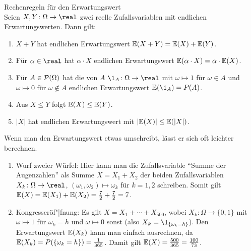 \linie

\begin{Satz}{Rechenregeln für den Erwartungswert}\\
    Seien $X, Y\colon \Omega \rightarrow \real$ zwei reelle Zufallsvariablen mit endlichen
    Erwartungswerten.
    Dann gilt:
    \begin{enumerate}
        \item
        $X + Y$ hat endlichen Erwartungswert $\EW(X + Y) = \EW(X) + \EW(Y)$.
        
        \item
        Für $\alpha \in \real$ hat
        $\alpha \cdot X$ endlichen Erwartungswert $\EW(\alpha \cdot X) = \alpha \cdot \EW(X)$.
        
        \item
        Für $A \in \P(\Omega)$ hat die  von $A$
        $\1_A\colon \Omega \rightarrow \real$ mit $\omega \mapsto 1$ für $\omega \in A$ und
        $\omega \mapsto 0$ für $\omega \notin A$ endlichen Erwartungswert $\EW(\1_A) = P(A)$.
        
        \item
        Aus $X \le Y$ folgt $\EW(X) \le \EW(Y)$.
        
        \item
        $|X|$ hat endlichen Erwartungswert mit $|\EW(X)| \le \EW(|X|)$.
    \end{enumerate}
\end{Satz}

\begin{Bsp}
    Wenn man den Erwartungswert etwas umschreibt, lässt er sich oft leichter berechnen.
    \begin{enumerate}
        \item
        Wurf zweier Würfel:
        Hier kann man die Zufallsvariable "`Summe der Augenzahlen"' als Summe $X = X_1 + X_2$
        der beiden Zufallsvariablen $X_k\colon \Omega \rightarrow \real$,
        $(\omega_1, \omega_2) \mapsto \omega_k$ für $k = 1, 2$ schreiben.
        Somit gilt $\EW(X) = \EW(X_1) + \EW(X_2) = \frac{7}{2} + \frac{7}{2} = 7$.
        
        \item
        Kongresseröf"|fnung:
        Es gilt $X = X_1 + \dotsb + X_{500}$, wobei
        $X_k\colon \Omega \rightarrow \{0, 1\}$ mit $\omega \mapsto 1$ für $\omega_k = h$
        und $\omega \mapsto 0$ sonst (also $X_k = \1_{\{\omega_k = h\}}$).
        Den Erwartungswert $\EW(X_k)$ kann man einfach ausrechnen,
        da $\EW(X_k) = P(\{\omega_k = h\}) = \frac{1}{365}$.
        Damit gilt $\EW(X) = \frac{500}{365} = \frac{100}{73}$.
    \end{enumerate}
\end{Bsp}


